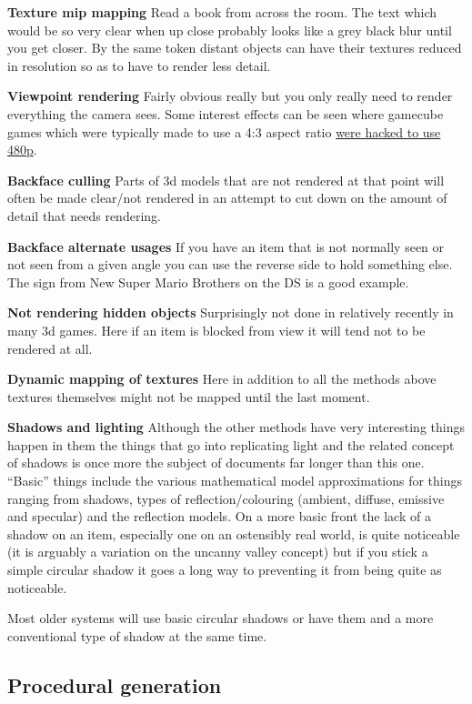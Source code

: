 \documentclass[
]{book}
\begin{document}
\textbf{Texture mip mapping} Read a book from across the room. The text which would be so very clear when up close probably looks like a grey black blur until you get closer. By the same token distant objects can have their textures reduced in resolution so as to have to render less detail.

\textbf{Viewpoint rendering} Fairly obvious really but you only really need to render everything the camera sees. Some interest effects can be seen where gamecube games which were typically made to use a 4:3 aspect ratio \href{http://www.youtube.com/watch?\&v=qombIUAadOs}{were hacked to use 480p}.

\textbf{Backface culling} Parts of 3d models that are not rendered at that point will often be made clear/not rendered in an attempt to cut down on the amount of detail that needs rendering.

\textbf{Backface alternate usages} If you have an item that is not normally seen or not seen from a given angle you can use the reverse side to hold something else. The sign from New Super Mario Brothers on the DS is a good example.

\textbf{Not rendering hidden objects} Surprisingly not done in relatively recently in many 3d games. Here if an item is blocked from view it will tend not to be rendered at all.

\textbf{Dynamic mapping of textures} Here in addition to all the methods above textures themselves might not be mapped until the last moment.

\textbf{Shadows and lighting} Although the other methods have very interesting things happen in them the things that go into replicating light and the related concept of shadows is once more the subject of documents far longer than this one. ``Basic'' things include the various mathematical model approximations for things ranging from shadows, types of reflection/colouring (ambient, diffuse, emissive and specular) and the reflection models. On a more basic front the lack of a shadow on an item, especially one on an ostensibly real world, is quite noticeable (it is arguably a variation on the uncanny valley concept) but if you stick a simple circular shadow it goes a long way to preventing it from being quite as noticeable.

Most older systems will use basic circular shadows or have them and a more conventional type of shadow at the same time.

\hypertarget{procedural-generation}{%
\subsection{Procedural generation}\label{procedural-generation}}
\end{document}
